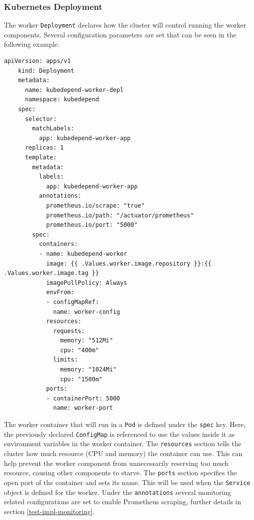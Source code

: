 \subsubsection{Kubernetes Deployment}

The worker \texttt{Deployment} declares how the cluster will control running the worker components. Several configuration parameters are set that can be seen in the following example.

\vspace{0.5cm}
\begin{minipage}{\linewidth}
	\begin{lstlisting}[caption={Worker \texttt{Deployment}}]
	apiVersion: apps/v1
	kind: Deployment
	metadata:
	  name: kubedepend-worker-depl
	  namespace: kubedepend
	spec:
	  selector:
	    matchLabels:
	      app: kubedepend-worker-app
	  replicas: 1
	  template:
	    metadata:
	      labels:
	        app: kubedepend-worker-app
	      annotations:
	        prometheus.io/scrape: "true"
	        prometheus.io/path: "/actuator/prometheus"
	        prometheus.io/port: "5000"
	    spec:
	      containers:
	      - name: kubedepend-worker
	        image: {{ .Values.worker.image.repository }}:{{ .Values.worker.image.tag }}
	        imagePullPolicy: Always
	        envFrom:
	        - configMapRef:
	          name: worker-config
	        resources:
	          requests:
	            memory: "512Mi"
	            cpu: "400m"
	          limits:
	            memory: "1024Mi"
	            cpu: "1500m"
	        ports:
	        - containerPort: 5000
	          name: worker-port\end{lstlisting}
\end{minipage}

The worker container that will run in a \texttt{Pod} is defined under the \texttt{spec} key. Here, the previously declared \texttt{ConfigMap} is referenced to use the values inside it as environment variables in the worker container. The \texttt{resources} section tells the cluster how much resource (CPU and memory) the container can use. This can help prevent the worker component from unnecessarily reserving too much resource, causing other components to starve. The \texttt{ports} section specifies the open port of the container and sets its name. This will be used when the \texttt{Service} object is defined for the worker. Under the \texttt{annotations} several monitoring related configurations are set to enable Prometheus scraping, further details in section \ref{test-impl-monitoring}.


